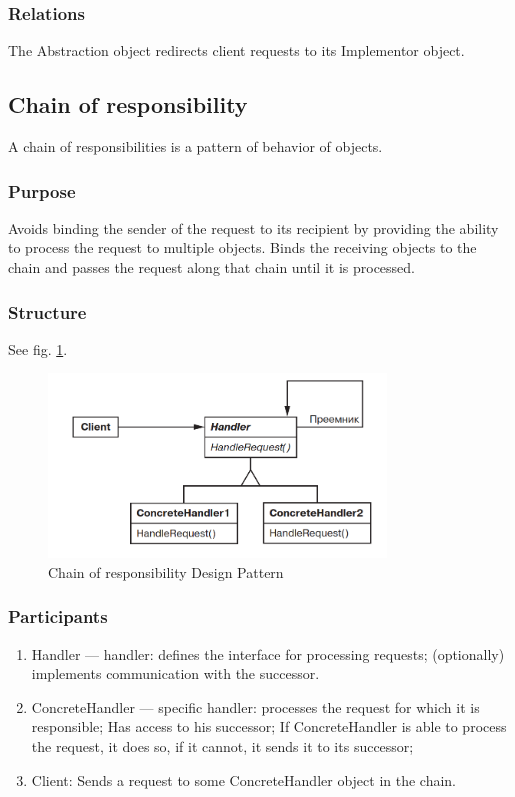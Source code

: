 \documentclass[sigplan,12pt,nonacm=true,review=false]{acmart}
\begin{document}
\subsubsection{Relations}
The Abstraction object redirects client requests to its  Implementor object.

\subsection{Chain of responsibility}
A chain of responsibilities is a pattern of behavior of objects.

\subsubsection{Purpose}
Avoids binding the sender of the request to its recipient by providing the ability to process the request to multiple objects. Binds the receiving objects to the chain and passes the request along that chain until it is processed.

\subsubsection{Structure}
See fig. \ref{fig:9}.
\begin{figure}[!t]
  \includegraphics[width=0.8\textwidth]{eolang/tr-02/assets/Picture9.png}
  \caption{Chain of responsibility Design Pattern}
  \label{fig:9}
\end{figure}

\subsubsection{Participants}
\begin{enumerate}
    \item Handler —  handler: defines the interface for processing requests; (optionally) implements communication with the successor.
    \item ConcreteHandler — specific handler: processes the request for which it is responsible; Has access to his successor; If ConcreteHandler  is able to process the request, it does so, if it cannot, it sends it to its successor;
    \item Client: Sends a request to some ConcreteHandler object in the chain.
\end{enumerate}
\end{document}
